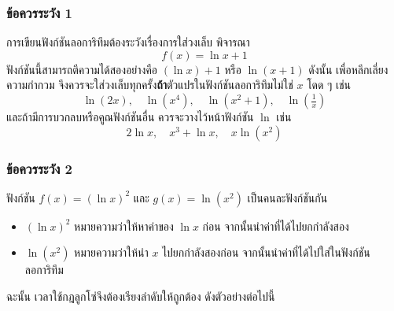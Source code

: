 \begin{frame}
\frametitle{ข้อควรระวัง 1}
\begin{remark}{}
การเขียนฟังก์ชันลอการิทึมต้องระวังเรื่องการใส่วงเล็บ พิจารณา
\[ f(x) = \ln x + 1\]
ฟังก์ชันนี้สามารถตีความได้สองอย่างคือ $(\ln x) + 1$ หรือ $\ln (x+1)$ ดังนั้น เพื่อหลีกเลี่ยงความกำกวม จึงควรจะใส่วงเล็บทุกครั้ง\textbf{ถ้า}ตัวแปรในฟังก์ชันลอการิทึมไม่ใช่ $x$ โดด ๆ เช่น
\[ \ln (2x), \quad \ln(x^4), \quad \ln (x^2+1), \quad \ln\left( \tfrac{1}{x} \right) \]
และถ้ามีการบวกลบหรือคูณฟังก์ชันอื่น ควรจะวางไว้หน้าฟังก์ชัน $\ln$ เช่น
\[ 2 \ln x, \quad x^3 + \ln x, \quad x\ln (x^2)\]
\end{remark}
\end{frame}

\begin{frame}
\frametitle{ข้อควรระวัง 2}
\begin{remark}{}
ฟังก์ชัน $f(x) =(\ln x)^2$ และ $g(x) = \ln (x^2)$ เป็นคนละฟังก์ชันกัน
\begin{itemize}
\item $(\ln x)^2$ หมายความว่าให้หาค่าของ $\ln x$ ก่อน จากนั้นนำค่าที่ได้ไปยกกำลังสอง
\item $\ln (x^2)$ หมายความว่าให้นำ $x$ ไปยกกำลังสองก่อน จากนั้นนำค่าที่ได้ไปใส่ในฟังก์ชันลอการิทึม
\end{itemize}
ฉะนั้น เวลาใช้กฎลูกโซ่จึงต้องเรียงลำดับให้ถูกต้อง ดังตัวอย่างต่อไปนี้

\end{remark}
\end{frame}


